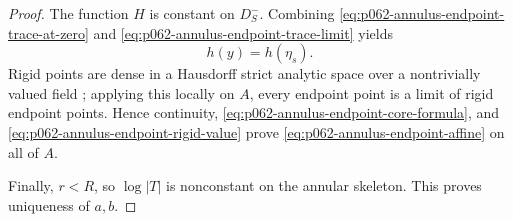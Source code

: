 \begin{proof}
The function \(H\) is constant on \(D^-_S\).  Combining
\eqref{eq:p062-annulus-endpoint-trace-at-zero} and
\eqref{eq:p062-annulus-endpoint-trace-limit} yields
\begin{equation}\label{eq:p062-annulus-endpoint-rigid-value}
                              h(y)=h(\eta_s).
\end{equation}
Rigid points are dense in a Hausdorff strict analytic space over a
nontrivially valued field
\cite[Proposition~2.1.15]{Berk12}; applying this locally on \(A\), every
endpoint point is a limit of rigid endpoint points.  Hence continuity,
\eqref{eq:p062-annulus-endpoint-core-formula}, and
\eqref{eq:p062-annulus-endpoint-rigid-value} prove
\eqref{eq:p062-annulus-endpoint-affine} on all of \(A\).

Finally, \(r<R\), so \(\log|T|\) is nonconstant on the annular skeleton.
This proves uniqueness of \(a,b\).
\end{proof}
